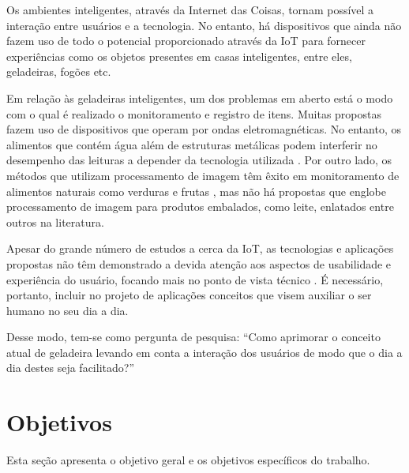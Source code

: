Os ambientes inteligentes, através da Internet das Coisas, tornam possível a interação entre usuários e a tecnologia. No entanto, há dispositivos que ainda não fazem uso de todo o potencial proporcionado através da IoT para fornecer experiências como os objetos presentes em casas inteligentes, entre eles, geladeiras, fogões etc.

Em relação às geladeiras inteligentes, um dos problemas em aberto está o modo com o qual é realizado o monitoramento e registro de itens. Muitas propostas fazem uso de dispositivos que operam por ondas eletromagnéticas. No entanto, os alimentos que contém água além de estruturas metálicas podem interferir no desempenho das leituras a depender da tecnologia utilizada \cite{Periyasamy2015, Qing2007}. Por outro lado, os métodos que utilizam processamento de imagem têm êxito em monitoramento de alimentos naturais como verduras e frutas \cite{Shweta2017}, mas não há propostas que englobe processamento de imagem para produtos embalados, como leite, enlatados entre outros na literatura.

Apesar do grande número de estudos a cerca da IoT, as tecnologias e aplicações propostas não têm demonstrado a devida atenção aos aspectos de usabilidade e experiência do usuário, focando mais no ponto de vista técnico \cite{Koreshoff2013}. É necessário, portanto, incluir no projeto de aplicações conceitos que visem auxiliar o ser humano no seu dia a dia.

Desse modo, tem-se como pergunta de pesquisa: ``Como aprimorar o conceito atual de geladeira levando em conta a interação dos usuários de modo que o dia a dia destes seja facilitado?''


\section{Objetivos}
Esta seção apresenta o objetivo geral e os objetivos específicos do trabalho.

